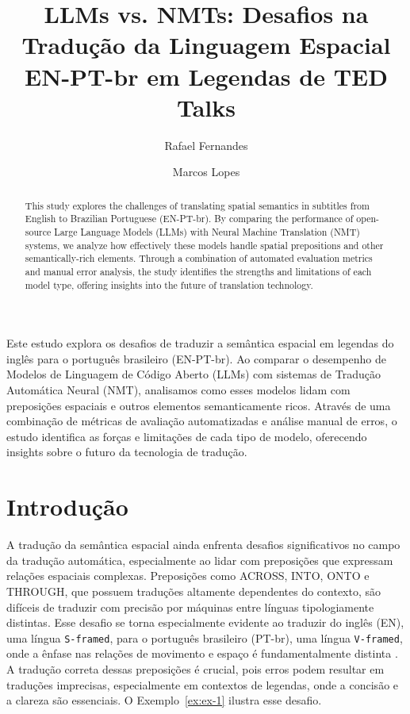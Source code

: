 \documentclass[a4paper, twocolumn, 11pt, twoside]{article}
\title{LLMs vs. NMTs: Desafios na Tradução da Linguagem Espacial EN-PT-br em Legendas de TED Talks}
\author{
  Rafael Fernandes
  \instituto{Universidade de São Paulo}
  \email{rafael.macario@usp.br} 
  \and 
  Marcos Lopes
  \instituto{Universidade de São Paulo}
  \email{marcoslopes@usp.br}
  \and
}
\begin{document}
\maketitle

\begin{resumo}
Este estudo explora os desafios de traduzir a semântica espacial em legendas do inglês para o português brasileiro (EN-PT-br). Ao comparar o desempenho de Modelos de Linguagem de Código Aberto (LLMs) com sistemas de Tradução Automática Neural (NMT), analisamos como esses modelos lidam com preposições espaciais e outros elementos semanticamente ricos. Através de uma combinação de métricas de avaliação automatizadas e análise manual de erros, o estudo identifica as forças e limitações de cada tipo de modelo, oferecendo insights sobre o futuro da tecnologia de tradução.
\end{resumo}



\begin{abstract}
This study explores the challenges of translating spatial semantics in subtitles from English to Brazilian Portuguese (EN-PT-br). By comparing the performance of open-source Large Language Models (LLMs) with Neural Machine Translation (NMT) systems, we analyze how effectively these models handle spatial prepositions and other semantically-rich elements. Through a combination of automated evaluation metrics and manual error analysis, the study identifies the strengths and limitations of each model type, offering insights into the future of translation technology.
\end{abstract}




\section{Introdução}

A tradução da semântica espacial ainda enfrenta desafios significativos no campo da tradução automática, especialmente ao lidar com preposições que expressam relações espaciais complexas. Preposições como ACROSS, INTO, ONTO e THROUGH, que possuem traduções altamente dependentes do contexto, são difíceis de traduzir com precisão por máquinas entre línguas tipologiamente distintas. Esse desafio se torna especialmente evidente ao traduzir do inglês (EN), uma língua \texttt{S-framed}, para o português brasileiro (PT-br), uma língua \texttt{V-framed}, onde a ênfase nas relações de movimento e espaço é fundamentalmente distinta \citep{talmy2000toward,talmy2000towardb, Slobin-2004, slobin2005relating, Slobin2006WhatMM}. A tradução correta dessas preposições é crucial, pois erros podem resultar em traduções imprecisas, especialmente em contextos de legendas, onde a concisão e a clareza são essenciais. O Exemplo~\ref{ex:ex-1} ilustra esse desafio.
\end{document}
